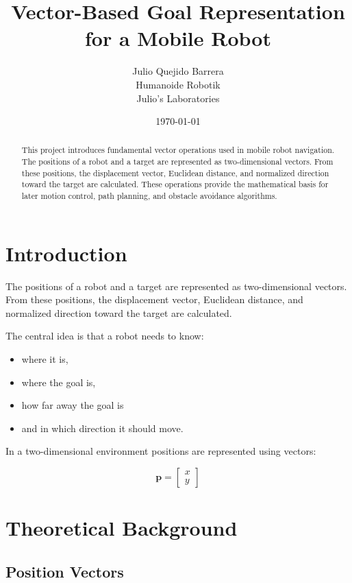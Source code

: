 \documentclass[10pt,twocolumn,a4paper]{article}
\title{
    \textbf{Vector-Based Goal Representation\\
    for a Mobile Robot}
}
\author{
    Julio Quejido Barrera\\
    Humanoide Robotik\\
    Julio's Laboratories
}
\date{\today}
\begin{document}

\maketitle

\begin{abstract}
This project introduces fundamental vector operations used in mobile
robot navigation. The positions of a robot and a target are represented as 
two-dimensional vectors. From these positions, the displacement vector, Euclidean distance, 
and normalized direction toward the target are calculated. These operations 
provide the mathematical basis for later motion control, path planning, and 
obstacle avoidance algorithms.
\end{abstract}

\section{Introduction}

The positions of a robot and a target are represented as two-dimensional vectors. 
From these positions, the displacement vector, Euclidean distance, 
and normalized direction toward the target are calculated.

The central idea is that a robot needs to know:

\begin{itemize}
    \item where it is,
    \item where the goal is,
    \item how far away the goal is
    \item and in which direction it should move.
\end{itemize}

In a two-dimensional environment positions are represented using vectors:

\[
\mathbf{p} =
\begin{bmatrix}
x \\
y
\end{bmatrix}
\]

\section{Theoretical Background}

\subsection{Position Vectors}
\end{document}
